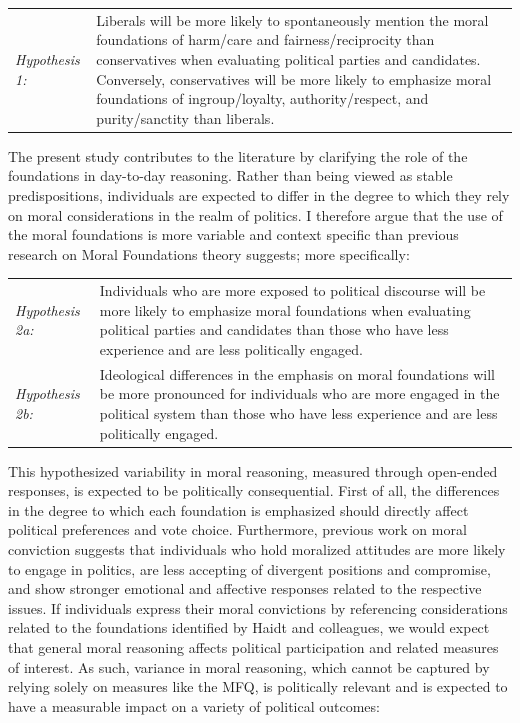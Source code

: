 \documentclass[12pt]{article}
\begin{document}
\vspace{0.3cm}
\begin{tabular}{lp{12cm}}
\textsl{Hypothesis 1:} & Liberals will be more likely to spontaneously mention the moral foundations of harm/care and fairness/reciprocity  than conservatives when evaluating political parties and candidates. Conversely, conservatives will be more likely to emphasize moral foundations of ingroup/loyalty, authority/respect, and purity/sanctity than liberals.
\end{tabular}
\vspace{0.5cm}

The present study contributes to the literature by clarifying the role of the foundations in day-to-day reasoning. Rather than being viewed as stable predispositions, individuals are expected to differ in the degree to which they rely on moral considerations in the realm of politics. I therefore argue that the use of the moral foundations is more variable and context specific than previous research on Moral Foundations theory suggests; more specifically:

\vspace{0.3cm}
\begin{tabular}{lp{12cm}}
\textsl{Hypothesis 2a:} & Individuals who are more exposed to political discourse will be more likely to emphasize moral foundations when evaluating political parties and candidates than those who have less experience and are less politically engaged. \\
\textsl{Hypothesis 2b:} & Ideological differences in the emphasis on moral foundations will be more pronounced for individuals who are more engaged in the political system than those who have less experience and are less politically engaged.
\end{tabular}
\vspace{0.5cm}

This hypothesized variability in moral reasoning, measured through open-ended responses, is expected to be politically consequential. First of all, the differences in the degree to which each foundation is emphasized should directly affect political preferences and vote choice. Furthermore, previous work on moral conviction suggests that individuals who hold moralized attitudes are more likely to engage in politics, are less accepting of divergent positions and compromise, and show stronger emotional and affective responses related to the respective issues. If individuals express their moral convictions by referencing considerations related to the foundations identified by Haidt and colleagues, we would expect that general moral reasoning affects political participation and related measures of interest. As such, variance in moral reasoning, which cannot be captured by relying solely on measures like the MFQ, is politically relevant and is expected to have a measurable impact on a variety of political outcomes:
\end{document}
